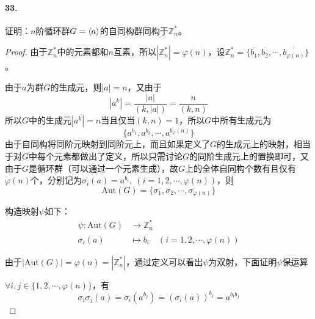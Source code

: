 \documentclass[12pt, a4paper, oneside]{ctexart}
\begin{document}
\paragraph{33.}证明：$n$阶循环群$G=\braket{a}$的自同构群同构于$\mathbb{Z}_n^*$。
\begin{proof}
    由于$\mathbb{Z}_n^*$中的元素都和$n$互素，所以$|\mathbb{Z}_n^*|=\varphi(n)$，设$\mathbb{Z}_n^* = \{\overline{b_1},\overline{b_2},\cdots,\overline{b_{\varphi(n)}}\}$。

    由于$a$为群$G$的生成元，则$|a| = n$，又由于
    \begin{equation*}
        |a^k| = \frac{|a|}{(k, |a|)} = \frac{n}{(k, n)}
    \end{equation*}
    所以$G$中的生成元$|a^k|=n$当且仅当$(k, n) = 1$，所以$G$中所有生成元为
    \begin{equation*}
        \{a^{b_1},a^{b_2},\cdots,a^{b_\varphi(n)}\}
    \end{equation*}
    由于自同构将同阶元映射到同阶元上，而且如果定义了$G$的生成元上的映射，相当于对$G$中每个元素都做出了定义，所以只需讨论$G$的同阶生成元上的置换即可，又由于$G$是循环群（可以通过一个元素生成），故$G$上的全体自同构个数有且仅有$\varphi(n)$个，分别记为$\sigma_i(a) = a^{b_i},\ (i = 1, 2,\cdots, \varphi(n))$，则
    \begin{equation*}
        \text{Aut}(G) = \{\sigma_1,\sigma_2,\cdots,\sigma_{\varphi(n)}\}
    \end{equation*}

    构造映射$\psi$如下：
    \begin{equation*}
        \begin{aligned}
            \psi:\text{Aut}(G)&\rightarrow \mathbb{Z}_n^*\\
            \sigma_i(a)&\mapsto \overline{b_i}\quad (i = 1, 2, \cdots, \varphi(n))
        \end{aligned}
    \end{equation*}

    由于$|\text{Aut}(G)| = \varphi(n) = |\mathbb{Z}_n^*|$，通过定义可以看出$\psi$为双射，下面证明$\psi$保运算

    $\forall i, j\in \{1, 2, \cdots, \varphi(n)\}$，有
    \begin{equation*}
        \sigma_i\sigma_j(a) = \sigma_i(a^{b_j}) = (\sigma_i(a))^{b_j} = a^{b_ib_j}
    \end{equation*}


\end{proof}
\end{document}

